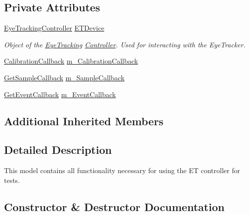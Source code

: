 \subsection*{Private Attributes}
\begin{DoxyCompactItemize}
\item 
\hyperlink{class_web_analyzer_1_1_eye_tracking_1_1_eye_tracking_controller}{Eye\+Tracking\+Controller} \hyperlink{class_web_analyzer_1_1_eye_tracking_1_1_eye_tracking_model_a8a1e9d54cc3f708adad7ea22653f6818}{E\+T\+Device}
\begin{DoxyCompactList}\small\item\em Object of the \hyperlink{namespace_web_analyzer_1_1_eye_tracking}{Eye\+Tracking} \hyperlink{namespace_web_analyzer_1_1_controller}{Controller}. Used for interacting with the Eye\+Tracker. \end{DoxyCompactList}\item 
\hyperlink{class_web_analyzer_1_1_eye_tracking_1_1_eye_tracking_model_ad6c2f20511c53eaf55a8fb18d263b51c}{Calibration\+Callback} \hyperlink{class_web_analyzer_1_1_eye_tracking_1_1_eye_tracking_model_ac209f94d8baa0d71cb3df9c7a4233c1f}{m\+\_\+\+Calibration\+Callback}
\item 
\hyperlink{class_web_analyzer_1_1_eye_tracking_1_1_eye_tracking_model_afa0ffe40b73c90761f49dec896df4baa}{Get\+Sample\+Callback} \hyperlink{class_web_analyzer_1_1_eye_tracking_1_1_eye_tracking_model_a968cb8269069b117054c23c913671380}{m\+\_\+\+Sample\+Callback}
\item 
\hyperlink{class_web_analyzer_1_1_eye_tracking_1_1_eye_tracking_model_a40785479d78104c591e53c7e2847e9ff}{Get\+Event\+Callback} \hyperlink{class_web_analyzer_1_1_eye_tracking_1_1_eye_tracking_model_a806e6c2c97d1e27187755e8d22f87d86}{m\+\_\+\+Event\+Callback}
\end{DoxyCompactItemize}
\subsection*{Additional Inherited Members}


\subsection{Detailed Description}
This model contains all functionality necessary for using the E\+T controller for tests. 



\subsection{Constructor \& Destructor Documentation}
\hypertarget{class_web_analyzer_1_1_eye_tracking_1_1_eye_tracking_model_a6be62a4dc74db08b88c80aa8603a06e2}{}
